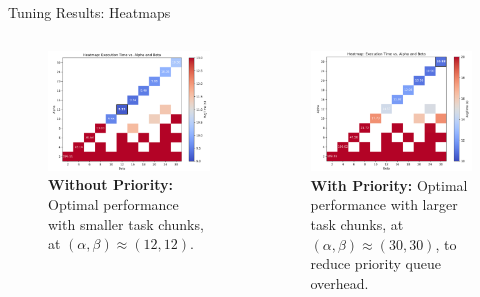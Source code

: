 \begin{frame}{Tuning Results: Heatmaps}

	\begin{columns}[c,onlytextwidth]
		\pause 
		\begin{figure}
		  \centering
		  \includegraphics[width=\textwidth]{heatmap_without_priority.png}
		  \caption{\textbf{Without Priority:} Optimal performance with smaller task chunks, at $(\alpha, \beta) \approx (12, 12)$.}
		\end{figure}
		
		\pause
		\begin{figure}
		  \centering
		  \includegraphics[width=\textwidth]{heatmap_with_priority.png}
		  \caption{\textbf{With Priority:} Optimal performance with larger task chunks, at $(\alpha, \beta) \approx (30, 30)$, to reduce priority queue overhead.}
		\end{figure}
	\end{columns}
  
\end{frame}